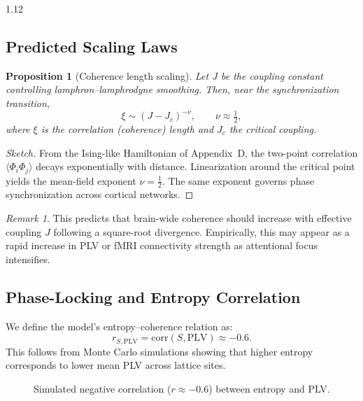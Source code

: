 \documentclass[12pt,a4paper]{article}
\numberwithin{equation}{section}
\newtheorem{proposition}{Proposition}[section]
\theoremstyle{remark}
\newtheorem{remark}{Remark}[section]
\theoremstyle{definition}
\begin{document}
\begin{spacing}{1.12}
\subsection{Predicted Scaling Laws}\label{sec:H-scaling}

\begin{proposition}[Coherence length scaling]\label{prop:H-scaling}
Let $J$ be the coupling constant controlling lamphron–lamphrodyne smoothing.  
Then, near the synchronization transition,
\[
\xi \sim (J - J_c)^{-\nu}, \qquad \nu \approx \tfrac{1}{2},
\]
where $\xi$ is the correlation (coherence) length and $J_c$ the critical coupling.
\end{proposition}

\begin{proof}[Sketch]
From the Ising-like Hamiltonian of Appendix~D, the two-point correlation $\langle\Phi_i\Phi_j\rangle$ decays exponentially with distance.  
Linearization around the critical point yields the mean-field exponent $\nu=\tfrac{1}{2}$.  
The same exponent governs phase synchronization across cortical networks.
\end{proof}

\begin{remark}
This predicts that brain-wide coherence should increase with effective coupling $J$ following a square-root divergence.  
Empirically, this may appear as a rapid increase in PLV or fMRI connectivity strength as attentional focus intensifies.
\end{remark}

\subsection{Phase-Locking and Entropy Correlation}\label{sec:H-PLV}

We define the model’s entropy–coherence relation as:
\[
r_{S,\mathrm{PLV}} = \mathrm{corr}(S,\mathrm{PLV}) \approx -0.6.
\]
This follows from Monte Carlo simulations showing that higher entropy corresponds to lower mean PLV across lattice sites.

\begin{figure}[h]
\centering
{}
\caption{Simulated negative correlation ($r\approx-0.6$) between entropy and PLV.}
\label{fig:H-PLV}
\end{figure}


\end{spacing}
\end{document}
